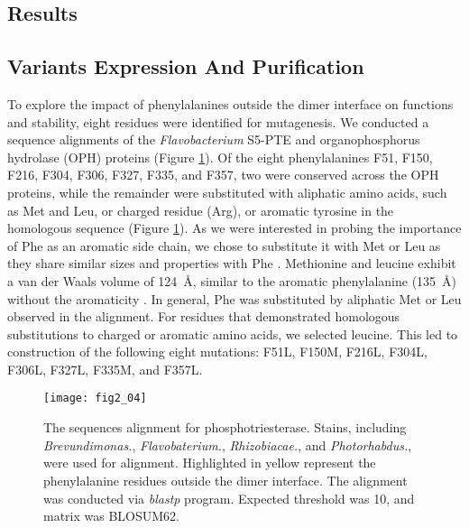 \begin{refsection}
\section{Results}

\subsection{Variants Expression And Purification}

To explore the impact of phenylalanines outside the dimer interface on
functions and stability, eight residues were identified for mutagenesis. We
conducted a sequence alignments of the \emph{Flavobacterium} S5-PTE and
organophosphorus hydrolase (OPH) proteins (Figure \ref{fig:pte-alignment}). Of
the eight phenylalanines F51, F150, F216, F304, F306, F327, F335, and F357, two
were conserved across the OPH proteins, while the remainder were substituted
with aliphatic amino acids, such as Met and Leu, or charged residue (Arg), or
aromatic tyrosine in the homologous sequence (Figure \ref{fig:pte-alignment}).
As we were interested in probing the importance of Phe as an aromatic side
chain, we chose to substitute it with Met or Leu as they share similar
sizes and properties with Phe \cite{Richards1974,McDaniel1988}. Methionine and
leucine exhibit a van der Waals volume of \SI{124}{\angstrom}, similar to the
aromatic phenylalanine (\SI{135}{\angstrom}) without the
aromaticity \cite{Barnes2007,Richards1974}. In general, Phe was substituted by
aliphatic Met or Leu observed in the alignment.  For residues that demonstrated
homologous substitutions to charged or aromatic amino acids, we selected
leucine. This led to construction of the following eight mutations: F51L,
F150M, F216L, F304L, F306L, F327L, F335M, and F357L. 
\begin{figure}[htbp] \centering \texttt{[image: fig2\_04]}
    \caption[The sequences alignment for phosphotriesterase. Stains, including
        \emph{Brevundimonas.}, \emph{Flavobaterium.}, \emph{Rhizobiacae.}, and
        \emph{Photorhabdus.}, were used for alignment. Highlighted in yellow
        represent the phenylalanine residues outside the dimer interface. The
        alignment was conducted via \emph{blastp} program. Expected threshold
    was 10, and matrix was BLOSUM62.]{The sequences alignment for
        phosphotriesterase. Stains, including \emph{Brevundimonas.},
        \emph{Flavobaterium.}, \emph{Rhizobiacae.}, and \emph{Photorhabdus.},
        were used for alignment. Highlighted in yellow represent the
        phenylalanine residues outside the dimer interface. The alignment was
        conducted via \emph{blastp} program. Expected threshold was 10, and
    matrix was BLOSUM62.}
    \label{fig:pte-alignment}
\end{figure}


\end{refsection}
